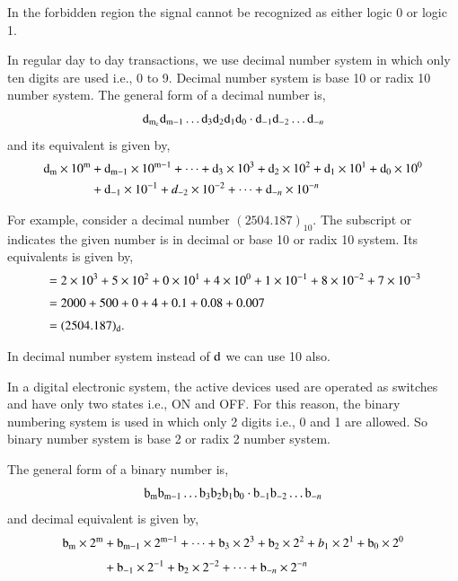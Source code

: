 In the forbidden region the signal cannot be recognized as either logic 0 or logic 1.

\vfill\eject

\smallskip
{}

In regular day to day transactions, we use decimal number system in which only ten digits are used i.e., 0 to 9. Decimal number system is base 10 or radix 10 number system. The general form of a decimal number is,
$$
\textrm{d}_{\textrm{m}_{\textrm{c}}}\textrm{d}_{\textrm{m}-1}\ldots \textrm{d}_{3}\textrm{d}_{2}\textrm{d}_{1}\textrm{d}_{0}\cdot \textrm{d}_{-1}\textrm{d}_{-2}\ldots \textrm{d}_{-n}
$$
and its equivalent is given by,
\begin{align*}
\textrm{d}_{\textrm{m}}\times 10^{\textrm{m}} &+ \textrm{d}_{\textrm{m}-1}\times 10^{\textrm{m}-1}+\cdots+\textrm{d}_{3}\times 10^{3}+\textrm{d}_{2}\times 10^{2}+\textrm{d}_{1}\times 10^{1}+\textrm{d}_{0}\times 10^{0}\\
& + \textrm{d}_{-1}\times 10^{-1}+d_{-2}\times 10^{-2}+\cdots+\textrm{d}_{-n}\times 10^{-n}
\end{align*}

For example, consider a decimal number $(2504.187)_{10}$. The subscript or indicates the given number is in decimal or base 10 or radix 10 system. Its equivalents is given by,
\begin{align*}
&= 2\times 10^{3}+5\times 10^{2}+0\times 10^{1}+4\times 10^{0}+1\times 10^{-1}+8\times 10^{-2}+7\times 10^{-3}\\[3pt]
&= 2000+500+0+4+0.1+0.08+0.007\\[3pt]
&= (2504.187)_{\textrm{d}}.
\end{align*}

In decimal number system instead of $\textrm{d}$ we can use 10 also.

\smallskip
{}

In a digital electronic system, the active devices used are operated as switches and have only two states i.e., ON and OFF. For this reason, the binary numbering system is used in which only 2 digits i.e., 0 and 1 are allowed. So binary number system is base 2 or radix 2 number system.

The general form of a binary number is,
$$
\textrm{b}_{\textrm{m}}\textrm{b}_{\textrm{m}-1}\ldots \textrm{b}_{3}\textrm{b}_{2}\textrm{b}_{1}\textrm{b}_{0}\cdot \textrm{b}_{-1}\textrm{b}_{-2}\ldots \textrm{b}_{-n}
$$
and decimal equivalent is given by,
\begin{align*}
\textrm{b}_{\textrm{m}}\times 2^{\textrm{m}} &+ \textrm{b}_{\textrm{m}-1}\times 2^{\textrm{m}-1}+\cdots+\textrm{b}_{3}\times 2^{3}+\textrm{b}_{2}\times 2^{2}+b_{1}\times 2^{1}+\textrm{b}_{0}\times 2^{0}\\[3pt]
&+ \textrm{b}_{-1}\times 2^{-1}+\textrm{b}_{2}\times 2^{-2}+\cdots+\textrm{b}_{-n}\times 2^{-n}
\end{align*}

